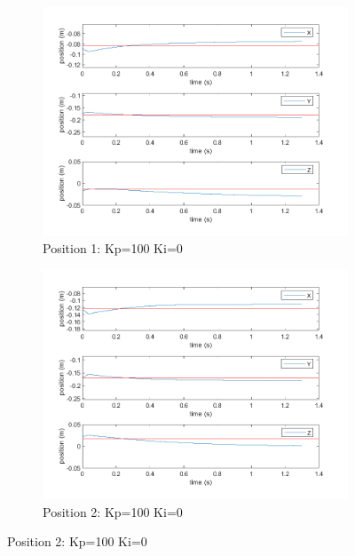 \begin{figure}[ht]
    \centering

    \begin{subfigure}[b]{0.45\textwidth}
        \includegraphics[width=\linewidth]{Pictures/Controller/Kp100Ki0/1.png}
        \caption{Position 1: Kp=100 Ki=0}
    \end{subfigure}%
    \hfill
    \begin{subfigure}[b]{0.45\textwidth}
        \includegraphics[width=\linewidth]{Pictures/Controller/Kp100Ki0/17.png}
        \caption{Position 2: Kp=100 Ki=0}
    \end{subfigure}

    \vspace{2pt} %


\end{figure}
